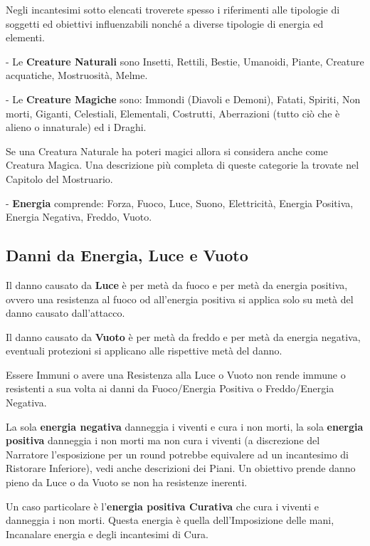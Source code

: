 \begin{multicols}{2}
Negli incantesimi sotto elencati troverete spesso i riferimenti alle tipologie di soggetti ed obiettivi influenzabili nonché a diverse tipologie di energia ed elementi.

- Le \textbf{Creature Naturali} sono Insetti, Rettili, Bestie, Umanoidi, Piante, Creature acquatiche, Mostruosità, Melme.

- Le \textbf{Creature Magiche} sono: Immondi (Diavoli e Demoni), Fatati, Spiriti, Non morti, Giganti, Celestiali, Elementali, Costrutti, Aberrazioni (tutto ciò che è alieno o innaturale) ed i Draghi.

Se una Creatura Naturale ha poteri magici allora si considera anche come Creatura Magica. Una descrizione più completa di queste categorie la trovate nel Capitolo del Mostruario.

- \textbf{Energia} comprende: Forza, Fuoco, Luce, Suono, Elettricità, Energia Positiva, Energia Negativa, Freddo, Vuoto.\label{elencoenergia}\hypertarget{elencoenergia}{}

\subsection{Danni da Energia, Luce e Vuoto}

Il danno causato da \textbf{Luce} è per metà da fuoco e per metà da energia positiva, ovvero una resistenza al fuoco od all'energia positiva si applica solo su metà del danno causato dall'attacco.

Il danno causato da \textbf{Vuoto} è per metà da freddo e per metà da energia negativa, eventuali protezioni si applicano alle rispettive metà del danno.

Essere Immuni o avere una Resistenza alla Luce o Vuoto non rende immune o resistenti a sua volta ai danni da Fuoco/Energia Positiva o Freddo/Energia Negativa.

La sola \textbf{energia negativa} danneggia i viventi e cura i non morti, la sola \textbf{energia positiva} danneggia i non morti ma non cura i viventi (a discrezione del Narratore l'esposizione per un round potrebbe equivalere ad un incantesimo di Ristorare Inferiore), vedi anche descrizioni dei Piani. Un obiettivo prende danno pieno da Luce o da Vuoto se non ha resistenze inerenti.

Un caso particolare è l'\textbf{energia positiva Curativa} che cura i viventi e danneggia i non morti. Questa energia è quella dell'Imposizione delle mani, Incanalare energia e degli incantesimi di Cura.


\end{multicols}

